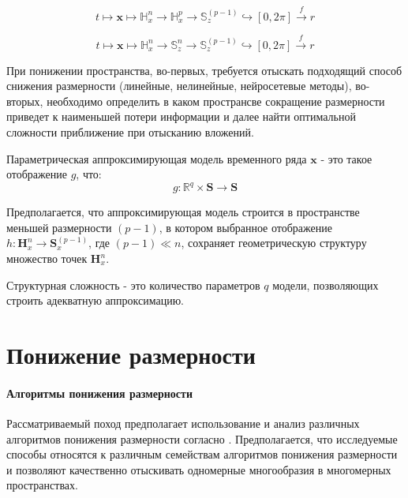 \documentclass[12pt,twoside]{article}
\begin{document}
\begin{equation}
	t \mapsto \mathbf{x} \mapsto \mathbb{H}_{x}^{n} \xrightarrow{} \mathbb{H}_{x}^{p} \xrightarrow{} \mathbb{S}_z^{(p-1)} \hookrightarrow [0,2\pi] \xrightarrow{f} r
\label{eq:goal}
\end{equation}

\begin{equation}
	t \mapsto \mathbf{x} \mapsto \mathbb{H}_{x}^{n} \xrightarrow{} \mathbb{S}_z^n \xrightarrow{} \mathbb{S}_z^{(p-1)} \hookrightarrow [0,2\pi] \xrightarrow{f} r
\label{eq:goal_2}
\end{equation}

При понижении пространства, во-первых, требуется отыскать подходящий способ снижения размерности (линейные, нелинейные, нейросетевые методы), во-вторых, необходимо определить в каком пространсве сокращение размерности приведет к наименьшей потери информации и далее найти оптимальной сложности приближение при отысканию вложений. 
\vspace{\baselineskip}

\begin{Def}
Параметрическая аппроксимирующая модель временного ряда  $\mathbf{x}$  - это такое отображение $g$, что:
\begin{equation}
	g: \mathbb{R}^{q} \times \mathbf{S} \xrightarrow{} \mathbf{S}
\label{eq:param_model}
\end{equation}
\end{Def}

Предполагается, что аппроксимирующая модель строится в пространстве меньшей размерности $(p-1)$, в котором выбранное отображение $h: \mathbf{H}_{x}^{n} \xrightarrow{} \mathbf{S}_x^{(p-1)} $, где $(p-1)\ll n$, сохраняет геометрическую структуру множество точек $\mathbf{H}_{x}^{n}$. 

\begin{Def}
Структурная сложность - это количество параметров $q$ модели, позволяющих строить адекватную аппроксимацию.
\end{Def}



\section{Понижение размерности}
\paragraph{Алгоритмы понижения размерности}
Рассматриваемый поход предполагает использование и анализ различных алгоритмов понижения размерности согласно \cite{Maaten2007}.
Предполагается, что исследуемые способы относятся к различным семействам алгоритмов понижения размерности и позволяют качественно отыскивать одномерные многообразия в многомерных пространствах.
\end{document}
